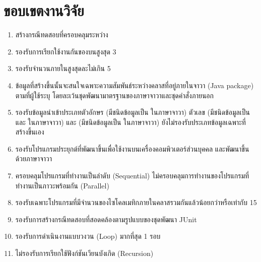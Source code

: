 \section{ขอบเขตงานวิจัย}
\label{sec:limitation}

\begin{enumerate}
    \label{enu:limitation}
    \item สร้างกรณีทดสอบที่ครอบคลุม{\TestPath}ระหว่าง{\CUT} \label{enu:lim:tc}
    \item รองรับการเรียกใช้งานกันของ{\CUT}บน{\TestPath}สูงสุด 3 {\class} \label{enu:lim:3linkingclass}
    \item รองรับจำนวน{\method}ภายใน{\CUT}สูงสุด{\class}ละไม่เกิน 5 {\method} \label{enu:lim:5methods}
    \item ข้อมูล{\scg}ที่สร้างขึ้นนั้นจะสนใจเฉพาะความสัมพันธ์ระหว่างคลาสที่อยู่ภายใน{\Package}จาวา (Java package) ตามที่ผู้ใช้ระบุ 
        โดยละเว้นชุดพัฒนามาตรฐานของภาษาจาวาและชุดคำสั่งภายนอก \label{enu:lim:scg}
    \item รองรับข้อมูลนำเข้าประเภทตัวอักษร (มีชนิดข้อมูลเป็น  ในภาษาจาวา) ตัวเลข 
        (มีชนิดข้อมูลเป็น  และ  ในภาษาจาวา) และ{\enum} 
        (มีชนิดข้อมูลเป็น  ในภาษาจาวา) ยังไม่รองรับประเภทข้อมูลเฉพาะที่สร้างขึ้นเอง \label{enu:lim:datatype}
    \item รองรับโปรแกรมประยุกต์ที่พัฒนาขึ้นเพื่อใช้งานบนเครื่องคอมพิวเตอร์ส่วนบุคคล และ{\sourcecode}พัฒนาขึ้นด้วยภาษาจาวา  \label{enu:lim:datatype}
    \item ครอบคลุมโปรแกรมที่ทำงานเป็นลำดับ (Sequential) ไม่ครอบคลุมการทำงานของโปรแกรมที่ทำงานเป็นภาวะพร้อมกัน (Parallel) \label{enu:lim:seq}
    \item รองรับเฉพาะโปรแกรมที่มีจำนวนของไซโคลเมทิกภายในคลาสรวมกันแล้วน้อยกว่าหรือเท่ากับ 15
    \item รองรับการสร้างกรณีทดสอบที่สอดคล้องตามรูปแบบของชุดพัฒนา JUnit
    \item รองรับการดำเนินงานแบบวงวน (Loop) มากที่สุด 1 รอบ \label{enu:lim:loop}
    \item ไม่รองรับการเรียกใช้ฟังก์ชันเวียนบังเกิด (Recursion)
\end{enumerate}
